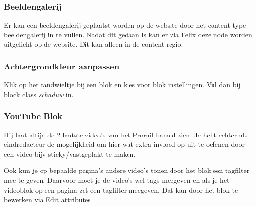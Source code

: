 \subsubsection{Beeldengalerij}
Er kan een beeldengalerij geplaatst worden op de website door het content type beeldengalerij in te vullen. Nadat dit gedaan is kan er via Felix deze node worden uitgelicht op de website. Dit kan alleen in de content regio.

\subsubsection{Achtergrondkleur aanpassen}
Klik op het tandwieltje bij een blok en kies voor blok instellingen. Vul dan bij block class \emph{schaduw} in.

\subsubsection{YouTube Blok}
Hij laat altijd de 2 laatste video's van het Prorail-kanaal zien. Je hebt echter als eindredacteur de mogelijkheid om hier wat extra invloed op uit te oefenen door een video bijv sticky/vastgeplakt te maken.

Ook kun je op bepaalde pagina's andere video's tonen door het blok een tagfilter mee te geven. Daarvoor moet je de video's wel tags meegeven en als je het videoblok op een pagina zet een tagfilter meegeven. Dat kan door het blok te bewerken via Edit attributes

